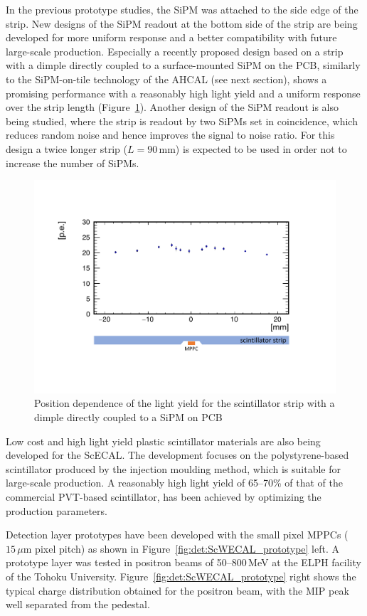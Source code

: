 In the previous prototype studies, the SiPM was attached to the side edge 
of the strip. 
New designs of the SiPM readout at the bottom side of the strip 
are being developed for more uniform response and a better compatibility 
with future large-scale production.
Especially a recently proposed design based on a strip 
with a dimple directly coupled to a surface-mounted SiPM on the PCB, similarly to the SiPM-on-tile technology of the AHCAL (see next section),
shows a promising performance with a reasonably high light yield and a uniform response 
over the strip length (Figure~\ref{fig:det:ScWECAL_strip}).
Another design of the SiPM readout is also being studied, where the strip 
is readout by two SiPMs set in coincidence, which reduces random noise and hence improves the signal to noise ratio. For this design a twice longer strip ($L=90\,\mathrm{mm}$) is expected to be used in order
not to increase the number of SiPMs.

\begin{figure}[htb]
\centering
\includegraphics[width=0.7\hsize]{Detector/fig/ScWECAL_strip.pdf}
\caption{Position dependence of the light yield for the scintillator 
strip with a dimple directly coupled to a SiPM on PCB}
\label{fig:det:ScWECAL_strip}
\end{figure}


Low cost and high light yield plastic scintillator materials are also being developed 
for the ScECAL.
The development focuses on the polystyrene-based scintillator 
produced by the injection moulding method, which is suitable 
for large-scale production. 
A reasonably high light yield of 65--70\% of that of 
the commercial PVT-based scintillator, has been achieved 
by optimizing the production parameters. 

Detection layer prototypes have been developed 
with the small pixel MPPCs ($15\,\mu\mathrm{m}$ pixel pitch) 
as shown in Figure~\ref{fig:det:ScWECAL_prototype} left.
A prototype layer was tested in positron beams of 50--800\,MeV 
at the ELPH facility of the Tohoku University.
Figure~\ref{fig:det:ScWECAL_prototype} right shows the typical charge distribution 
obtained for the positron beam, with the MIP peak well separated from the pedestal.

